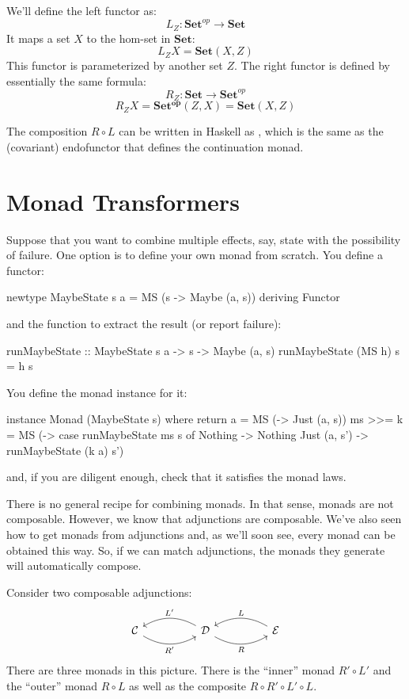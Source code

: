 \documentclass[DaoFP]{subfiles}
\begin{document}
We'll define the left functor as:
\[ L_Z \colon \mathbf{Set}^{op} \to \mathbf{Set} \] 
It maps a set $X$ to the hom-set in $\mathbf{Set}$:
\[ L_Z X = \mathbf{Set}(X, Z) \] 
This functor is parameterized by another set $Z$. The right functor is defined by essentially the same formula:
\[ R_Z \colon \mathbf{Set} \to \mathbf{Set}^{op} \] 
\[ R_Z X = \mathbf{Set^{op}}(Z, X)  = \mathbf{Set}(X, Z) \] 


The composition $R \circ L$ can be written in Haskell as , which is the same as the (covariant) endofunctor that defines the continuation monad.

\section{Monad Transformers}

Suppose that you want to combine multiple effects, say, state with the possibility of failure. One option is to define your own monad from scratch. You define a functor:
\begin{haskell}
newtype MaybeState s a = MS (s -> Maybe (a, s))
  deriving Functor
\end{haskell}
and the function to extract the result (or report failure):
\begin{haskell}
runMaybeState :: MaybeState s a -> s -> Maybe (a, s)
runMaybeState (MS h) s = h s
\end{haskell}
You define the monad instance for it:
\begin{haskell}
instance Monad (MaybeState s) where
  return a = MS (\s -> Just (a, s))
  ms >>= k = MS (\s -> case runMaybeState ms s of
                       Nothing -> Nothing
                       Just (a, s') -> runMaybeState (k a) s')
\end{haskell}
and, if you are diligent enough, check that it satisfies the monad laws.

There is no general recipe for combining monads. In that sense, monads are not composable. However, we know that adjunctions are composable. We've also seen how to get monads from adjunctions and, as we'll soon see, every monad can be obtained this way. So, if we can match adjunctions, the monads they generate will automatically compose.

Consider two composable adjunctions:
\[
 \begin{tikzcd}
  \mathcal{C}
  \arrow[rr, bend right, "R'"']
  &&
  \mathcal{D}
  \arrow[ll, bend right, "L'"']
    \arrow[rr, bend right, "R"']
&&
  \mathcal{E}
  \arrow[ll, bend right, "L"']
 \end{tikzcd}
\]
There are three monads in this picture. There is the ``inner'' monad $R' \circ L'$ and the ``outer'' monad $R \circ L$ as well as the composite $R \circ R' \circ L' \circ L$. 
\end{document}
